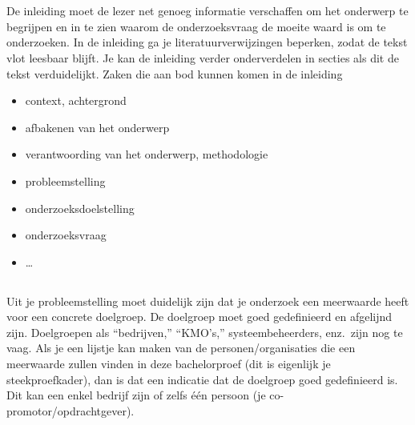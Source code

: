 
\chapter{}
\label{ch:inleiding}

De inleiding moet de lezer net genoeg informatie verschaffen om het onderwerp te begrijpen en in te zien waarom de onderzoeksvraag de moeite waard is om te onderzoeken. In de inleiding ga je literatuurverwijzingen beperken, zodat de tekst vlot leesbaar blijft. Je kan de inleiding verder onderverdelen in secties als dit de tekst verduidelijkt. Zaken die aan bod kunnen komen in de inleiding

\begin{itemize}
  \item context, achtergrond
  \item afbakenen van het onderwerp
  \item verantwoording van het onderwerp, methodologie
  \item probleemstelling
  \item onderzoeksdoelstelling
  \item onderzoeksvraag
  \item \ldots
\end{itemize}

\section{}
\label{sec:probleemstelling}

Uit je probleemstelling moet duidelijk zijn dat je onderzoek een meerwaarde heeft voor een concrete doelgroep. De doelgroep moet goed gedefinieerd en afgelijnd zijn. Doelgroepen als ``bedrijven,'' ``KMO's,'' systeembeheerders, enz.~zijn nog te vaag. Als je een lijstje kan maken van de personen/organisaties die een meerwaarde zullen vinden in deze bachelorproef (dit is eigenlijk je steekproefkader), dan is dat een indicatie dat de doelgroep goed gedefinieerd is. Dit kan een enkel bedrijf zijn of zelfs één persoon (je co-promotor/opdrachtgever).

\section{}
\label{sec:onderzoeksvraag}

